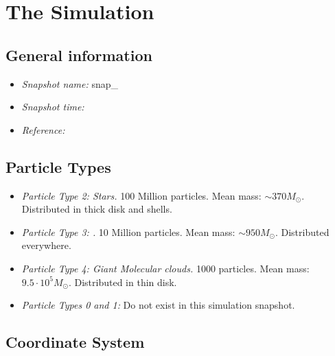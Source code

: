 \section{The Simulation}

\subsection{General information}

\begin{itemize}
\item \emph{Snapshot name:} snap\_
\item \emph{Snapshot time:} \Wilma{[TO DO]}
\item \emph{Reference:} \citet{2013ApJ...766...34D} 
\end{itemize}


\subsection{Particle Types}

\begin{itemize}
\item \emph{Particle Type 2: Stars.} 100 Million particles. Mean mass: $\sim 370 M_\odot$. Distributed in thick disk and shells.
\item \emph{Particle Type 3: \Wilma{[TO DO]}.} 10 Million particles. Mean mass: $\sim 950 M_\odot$. Distributed everywhere.
\item \emph{Particle Type 4: Giant Molecular clouds.} 1000 particles. Mean mass: $9.5 \cdot 10^5 M_\odot$. Distributed in thin disk. \citep{2013ApJ...766...34D}
\item \emph{Particle Types 0 and 1:} Do not exist in this simulation snapshot.
\end{itemize}


\subsection{Coordinate System}

